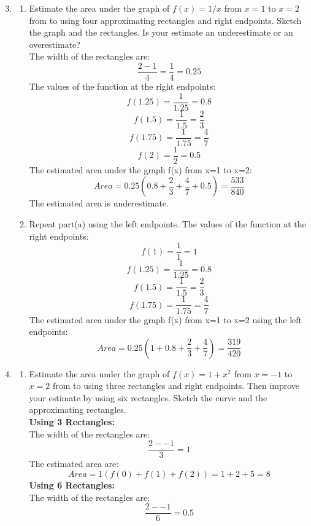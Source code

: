 \documentclass[12pt]{article}
\begin{document}
\begin{enumerate}
    \setcounter{enumi}{2}
    \item 
        \begin{enumerate}
            \item Estimate the area under the graph of $f(x) = 1/x$ from $x=1$ to $x=2$ from to using four approximating rectangles and right endpoints. Sketch the graph and the rectangles. Is your estimate an underestimate or an overestimate?\\
            The width of the rectangles are:
            \[\frac{2-1}{4} = \frac{1}{4} = 0.25\]
            The values of the function at the right endpoints:
            \[f(1.25) =  \frac{1}{1.25} = 0.8\]
            \[f(1.5) = \frac{1}{1.5} = \frac{2}{3}\]
            \[f(1.75) = \frac{1}{1.75} = \frac{4}{7}\]
            \[f(2) = \frac{1}{2} = 0.5\]
            The estimated area under the graph f(x) from x=1 to x=2:
            \[Area = 0.25(0.8 + \frac{2}{3} + \frac{4}{7} + 0.5) = \frac{533}{840}\]
            The estimated area is underestimate.
            \newpage
            \item Repeat part(a) using the left endpoints.
            The values of the function at the right endpoints:
            \[f(1) = \frac{1}{1} = 1\]
            \[f(1.25) = \frac{1}{1.25} = 0.8\]
            \[f(1.5) = \frac{1}{1.5} = \frac{2}{3}\]
            \[f(1.75) = \frac{1}{1.75} = \frac{4}{7}\]
            The estimated area under the graph f(x) from x=1 to x=2 using the left endpoints:
            \[Area = 0.25(1 + 0.8 + \frac{2}{3} + \frac{4}{7}) = \frac{319}{420}\]
        \end{enumerate}
        \setcounter{enumi}{4}
        \item
        \begin{enumerate}
            \item Estimate the area under the graph of $f(x) = 1 + x^2$ from $x=-1$ to $x=2$ from to using three rectangles and right endpoints. Then improve your estimate by using six rectangles. Sketch the curve and the approximating rectangles.\\
            \textbf{Using 3 Rectangles:}\\
            The width of the rectangles are:
            \[\frac{2--1}{3} = 1\]
            The estimated area are:
            \[Area = 1(f(0) + f(1) + f(2)) = 1 + 2 + 5 = 8\]
            \textbf{Using 6 Rectangles:}\\
            The width of the rectangles are:
            \[\frac{2--1}{6} = 0.5\]

\end{enumerate}
\end{enumerate}
\end{document}
